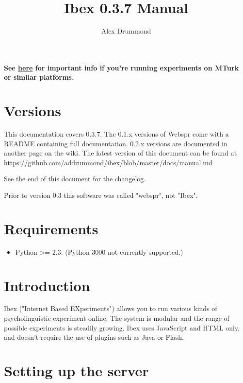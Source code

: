 \documentclass[
]{article}
\author{}
\date{}
\providecommand{\tightlist}{%
  \setlength{\itemsep}{0pt}\setlength{\parskip}{0pt}}
\begin{document}
\date{}
\author{Alex Drummond}
\title{Ibex 0.3.7 Manual}

\maketitle

\tableofcontents

\textbf{See
\href{https://tmalsburg.github.io/latin-squares-with-ibex.html}{here}
for important info if you're running experiments on MTurk or similar
platforms.}

\hypertarget{versions}{%
\section{Versions}\label{versions}}

This documentation covers 0.3.7. The 0.1.x versions of Webspr come with
a README containing full documentation. 0.2.x versions are documented in
another page on the wiki. The latest version of this document can be
found at
\url{https://github.com/addrummond/ibex/blob/master/docs/manual.md}

See the end of this document for the changelog.

Prior to version 0.3 this software was called "webspr", not "Ibex".

\hypertarget{requirements}{%
\section{Requirements}\label{requirements}}

\begin{itemize}
\tightlist
\item
  Python \textgreater= 2.3. (Python 3000 not currently supported.)
\end{itemize}

\hypertarget{introduction}{%
\section{Introduction}\label{introduction}}

Ibex ("Internet Based EXperiments") allows you to run various kinds of
psycholinguistic experiment online. The system is modular and the range
of possible experiments is steadily growing. Ibex uses JavaScript and
HTML only, and doesn't require the use of plugins such as Java or Flash.

\hypertarget{setting-up-the-server}{%
\section{Setting up the server}\label{setting-up-the-server}}
\end{document}
